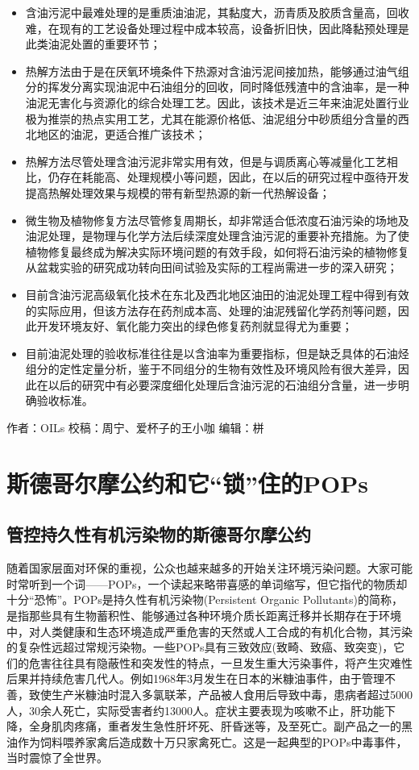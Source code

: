 \documentclass[]{book}
\begin{document}
\begin{itemize}
\item
  含油污泥中最难处理的是重质油油泥，其黏度大，沥青质及胶质含量高，回收难，在现有的工艺设备处理过程中成本较高，设备折旧快，因此降黏预处理是此类油泥处置的重要环节；
\item
  热解方法由于是在厌氧环境条件下热源对含油污泥间接加热，能够通过油气组分的挥发分离实现油泥中石油组分的回收，同时降低残渣中的含油率，是一种油泥无害化与资源化的综合处理工艺。因此，该技术是近三年来油泥处置行业极为推崇的热点实用工艺，尤其在能源价格低、油泥组分中砂质组分含量的西北地区的油泥，更适合推广该技术；
\item
  热解方法尽管处理含油污泥非常实用有效，但是与调质离心等减量化工艺相比，仍存在耗能高、处理规模小等问题，因此，在以后的研究过程中亟待开发提高热解处理效果与规模的带有新型热源的新一代热解设备；
\item
  微生物及植物修复方法尽管修复周期长，却非常适合低浓度石油污染的场地及油泥处理，是物理与化学方法后续深度处理含油污泥的重要补充措施。为了使植物修复最终成为解决实际环境问题的有效手段，如何将石油污染的植物修复从盆栽实验的研究成功转向田间试验及实际的工程尚需进一步的深入研究；
\item
  目前含油污泥高级氧化技术在东北及西北地区油田的油泥处理工程中得到有效的实际应用，但该方法存在药剂成本高、处理的油泥残留化学药剂等问题，因此开发环境友好、氧化能力突出的绿色修复药剂就显得尤为重要；
\item
  目前油泥处理的验收标准往往是以含油率为重要指标，但是缺乏具体的石油烃组分的定性定量分析，鉴于不同组分的生物有效性及环境风险有很大差异，因此在以后的研究中有必要深度细化处理后含油污泥的石油组分含量，进一步明确验收标准。
\end{itemize}

作者：OILs 校稿：周宁、爱杯子的王小咖 编辑：栟

\section{\texorpdfstring{斯德哥尔摩公约和它``锁''住的POPs}{斯德哥尔摩公约和它锁住的POPs}}\label{pops}

\subsection{管控持久性有机污染物的斯德哥尔摩公约}

随着国家层面对环保的重视，公众也越来越多的开始关注环境污染问题。大家可能时常听到一个词------POPs，一个读起来略带喜感的单词缩写，但它指代的物质却十分``恐怖''。POPs是持久性有机污染物(Persistent
Organic
Pollutants)的简称，是指那些具有生物蓄积性、能够通过各种环境介质长距离迁移并长期存在于环境中，对人类健康和生态环境造成严重危害的天然或人工合成的有机化合物，其污染的复杂性远超过常规污染物。一些POPs具有三致效应(致畸、致癌、致突变)，它们的危害往往具有隐蔽性和突发性的特点，一旦发生重大污染事件，将产生灾难性后果并持续危害几代人。例如1968年3月发生在日本的米糠油事件，由于管理不善，致使生产米糠油时混入多氯联苯，产品被人食用后导致中毒，患病者超过5000人，30余人死亡，实际受害者约13000人。症状主要表现为咳嗽不止，肝功能下降，全身肌肉疼痛，重者发生急性肝坏死、肝昏迷等，及至死亡。副产品之一的黑油作为饲料喂养家禽后造成数十万只家禽死亡。这是一起典型的POPs中毒事件，当时震惊了全世界。
\end{document}
